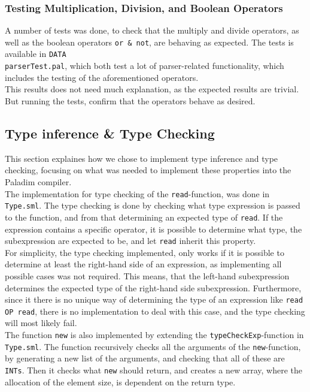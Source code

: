 \documentclass[10pt]{article}
\begin{document}
\subsubsection{Testing Multiplication, Division, and Boolean Operators}
A number of tests was done, to check that the multiply and divide operators, as well as the boolean operators \texttt{or \& not}, are behaving as expected. The tests is available in \texttt{DATA\\parserTest.pal}, which both test a lot of parser-related functionality, which includes the testing of the aforementioned operators.\\

This results does not need much explanation, as the expected results are trivial. But running the tests, confirm that the operators behave as desired.

\subsection{Type inference \& Type Checking}
This section explaines how we chose to implement type inference and type checking, focusing on what was needed to implement these properties into the Paladim compiler.\\
The implementation for type checking of the \texttt{read}-function, was done in \texttt{Type.sml}. The type checking is done by checking what type expression is passed to the function, and from that determining an expected type of \texttt{read}. If the expression contains a specific operator, it is possible to determine what type, the subexpression are expected to be, and let \texttt{read} inherit this property.\\
For simplicity, the type checking implemented, only works if it is possible to determine at least the right-hand side of an expression, as implementing all possible cases was not required. This means, that the left-hand subexpression determines the expected type of the right-hand side subexpression. Furthermore, since it there is no unique way of determining the type of an expression like \texttt{read OP read}, there is no implementation to deal with this case, and the type checking will most likely fail.\\
The function \texttt{new} is also implemented by extending the \texttt{typeCheckExp}-function in \texttt{Type.sml}. The function recursively checks all the arguments of the \texttt{new}-function, by generating a new list of the arguments, and checking that all of these are \texttt{INTs}. Then it checks what \texttt{new} should return, and creates a new array, where the allocation of the element size, is dependent on the return type.
\end{document}

